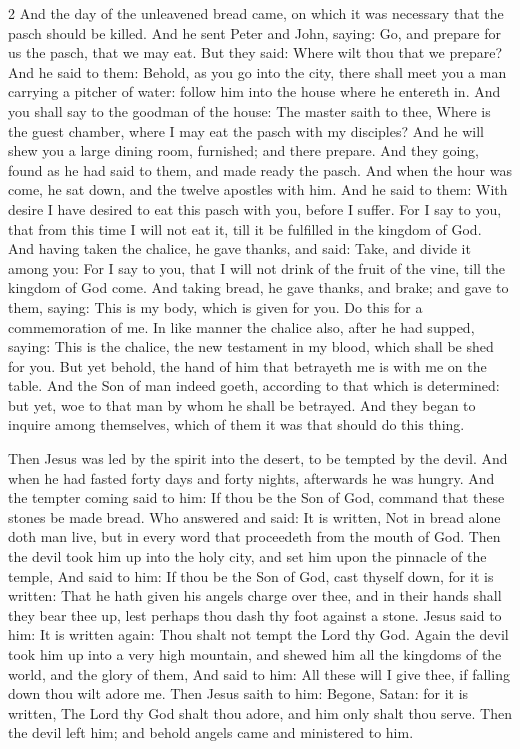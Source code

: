 \begin{multicols}{2}
And the day of the unleavened bread came, on which it was necessary that the pasch should be killed. And he sent Peter and John, saying: Go, and prepare for us the pasch, that we may eat. But they said: Where wilt thou that we prepare? And he said to them: Behold, as you go into the city, there shall meet you a man carrying a pitcher of water: follow him into the house where he entereth in. And you shall say to the goodman of the house: The master saith to thee, Where is the guest chamber, where I may eat the pasch with my disciples? And he will shew you a large dining room, furnished; and there prepare. And they going, found as he had said to them, and made ready the pasch. And when the hour was come, he sat down, and the twelve apostles with him. And he said to them: With desire I have desired to eat this pasch with you, before I suffer. For I say to you, that from this time I will not eat it, till it be fulfilled in the kingdom of God. And having taken the chalice, he gave thanks, and said: Take, and divide it among you: For I say to you, that I will not drink of the fruit of the vine, till the kingdom of God come. And taking bread, he gave thanks, and brake; and gave to them, saying: This is my body, which is given for you. Do this for a commemoration of me. In like manner the chalice also, after he had supped, saying: This is the chalice, the new testament in my blood, which shall be shed for you. But yet behold, the hand of him that betrayeth me is with me on the table. And the Son of man indeed goeth, according to that which is determined: but yet, woe to that man by whom he shall be betrayed. And they began to inquire among themselves, which of them it was that should do this thing. 

Then Jesus was led by the spirit into the desert, to be tempted by the devil. And when he had fasted forty days and forty nights, afterwards he was hungry. And the tempter coming said to him: If thou be the Son of God, command that these stones be made bread. Who answered and said: It is written, Not in bread alone doth man live, but in every word that proceedeth from the mouth of God. Then the devil took him up into the holy city, and set him upon the pinnacle of the temple, And said to him: If thou be the Son of God, cast thyself down, for it is written: That he hath given his angels charge over thee, and in their hands shall they bear thee up, lest perhaps thou dash thy foot against a stone. Jesus said to him: It is written again: Thou shalt not tempt the Lord thy God. Again the devil took him up into a very high mountain, and shewed him all the kingdoms of the world, and the glory of them, And said to him: All these will I give thee, if falling down thou wilt adore me. Then Jesus saith to him: Begone, Satan: for it is written, The Lord thy God shalt thou adore, and him only shalt thou serve. Then the devil left him; and behold angels came and ministered to him. 
\end{multicols}

